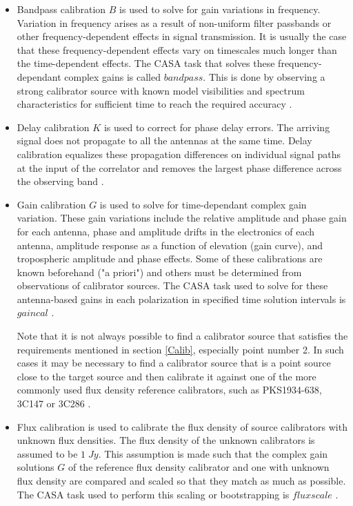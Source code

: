 \begin{itemize}

\item Bandpass calibration $B$ is used to solve for gain variations
in frequency. Variation in frequency arises as a result of non-uniform filter passbands or other frequency-dependent effects in signal transmission. It is usually the case that these frequency-dependent effects vary on timescales much longer than the time-dependent effects. The CASA task that solves these frequency-dependant complex gains is called $\textit{bandpass}$. This is done by observing a strong calibrator source with known model visibilities and spectrum characteristics for sufficient time to reach the required accuracy \citep{taylor1999synthesis}.

\item Delay calibration $K$ is used to correct for phase delay errors. The arriving signal does not propagate to all the antennas at the same time. Delay calibration equalizes these propagation differences on individual signal paths at the input of the correlator and removes the largest phase difference across the observing band \citep{taylor1999synthesis}.   

\item Gain calibration $G$ is used to solve for time-dependant complex gain variation. These gain variations include the relative amplitude and phase gain for each antenna, phase and amplitude drifts in the electronics of each antenna, amplitude response as a function of elevation (gain curve), and tropospheric amplitude and phase effects. Some of these calibrations are known beforehand ("a priori") and others must be determined from observations of calibrator sources. The CASA task used to solve for these antenna-based gains in each polarization in specified time solution intervals  is $\textit{gaincal}$ \citep{editioncasa}.  

Note that it is not always possible to find a calibrator source that satisfies the requirements mentioned in section \ref{Calib}, especially point number 2. In such cases it may be necessary to find a calibrator source that is a point source  close to the target source and then calibrate it against one of the more commonly used flux density reference calibrators, such as PKS1934-638, 3C147 or 3C286 \citep{thompson2001interferometry}. 

\item Flux calibration is used to calibrate the flux density of source calibrators with unknown flux densities. The flux density of the unknown calibrators is assumed to be $1\;Jy$. This assumption is made such that the complex gain solutions $G$ of the reference flux density calibrator and one with unknown flux density are compared and scaled so that they match as much as possible. The CASA task used to perform this scaling or bootstrapping is $\textit{fluxscale}$ \citep{editioncasa}.
\end{itemize}

